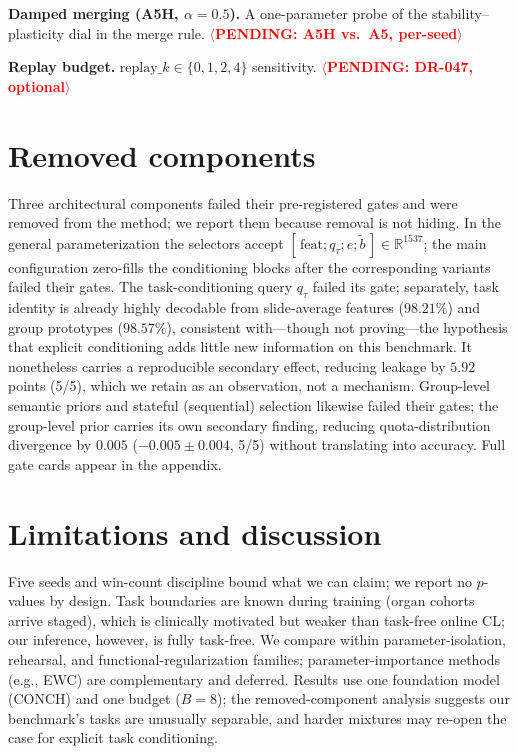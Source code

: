 \documentclass[11pt]{article}
\newcommand{\pending}[1]{\textcolor{red}{\textbf{$\langle$PENDING: #1$\rangle$}}}
\begin{document}
\textbf{Damped merging (A5H, $\alpha{=}0.5$).} A one-parameter probe of the stability--plasticity dial in the merge rule. \pending{A5H vs.\ A5, per-seed}

\textbf{Replay budget.} $\mathrm{replay}\_k\in\{0,1,2,4\}$ sensitivity. \pending{DR-047, optional}

\section{Removed components}\label{sec:removed}
Three architectural components failed their pre-registered gates and were removed from the method; we report them because removal is not hiding. In the general parameterization the selectors accept $[\,\mathrm{feat};q_\tau;e;\tilde b\,]\in\mathbb{R}^{1537}$; the main configuration zero-fills the conditioning blocks after the corresponding variants failed their gates. The task-conditioning query $q_\tau$ failed its gate; separately, task identity is already highly decodable from slide-average features ($98.21\%$) and group prototypes ($98.57\%$), consistent with---though not proving---the hypothesis that explicit conditioning adds little new information on this benchmark. It nonetheless carries a reproducible secondary effect, reducing leakage by $5.92$ points (5/5), which we retain as an observation, not a mechanism. Group-level semantic priors and stateful (sequential) selection likewise failed their gates; the group-level prior carries its own secondary finding, reducing quota-distribution divergence by $0.005$ ($-0.005{\pm}0.004$, 5/5) without translating into accuracy. Full gate cards appear in the appendix.

\section{Limitations and discussion}\label{sec:limitations}
Five seeds and win-count discipline bound what we can claim; we report no $p$-values by design. Task boundaries are known during training (organ cohorts arrive staged), which is clinically motivated but weaker than task-free online CL; our inference, however, is fully task-free. We compare within parameter-isolation, rehearsal, and functional-regularization families; parameter-importance methods (e.g., EWC) are complementary and deferred. Results use one foundation model (CONCH) and one budget ($B{=}8$); the removed-component analysis suggests our benchmark's tasks are unusually separable, and harder mixtures may re-open the case for explicit task conditioning.
\end{document}
